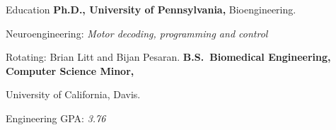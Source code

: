 \begin{rubric}{Education}
\entry*[2023 -- 2028 expected]%
	\textbf{Ph.D., University of Pennsylvania,} Bioengineering.\par 
	Neuroengineering: \emph{Motor decoding, programming and control}

	Rotating: Brian Litt and Bijan Pesaran.
%
\entry*[2018 -- 2022]%
	\textbf{B.S.~Biomedical Engineering, Computer Science Minor,} 
	
	University of California, Davis.\par 
	Engineering GPA: \emph{3.76}
% 
\end{rubric}